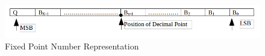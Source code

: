 \begin{figure}[H]
\centering
\includegraphics[scale=0.55]{figures/fpformat.png}
\caption{Fixed Point Number Representation}
\label{fig:Fixed Representation}
\end{figure}